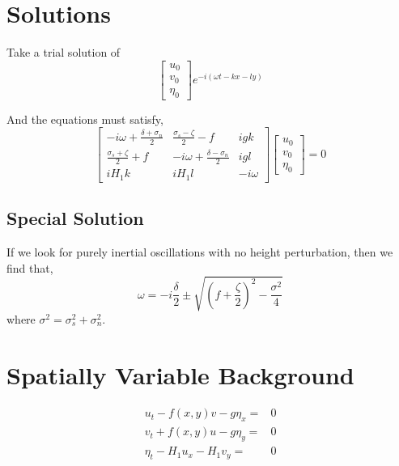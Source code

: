 \documentclass[11pt]{article}
\begin{document}
%
%
\section{Solutions}
%
%

Take a trial solution of
\begin{equation}
\left[\begin{array}{c}u_0 \\v_0 \\ \eta_0\end{array}\right]
e^{-i(\omega t - kx - ly)}
\end{equation}

And the equations must satisfy,
\begin{equation}
\left[\begin{array}{ccc}
-i\omega + \frac{\delta + \sigma_n}{2} & \frac{ \sigma_s - \zeta}{2} -f & igk \\
\frac{ \sigma_s + \zeta}{2}  + f  & -i\omega + \frac{ \delta - \sigma_n}{2} & igl \\
i H_1 k & i H_1 l & -i\omega
\end{array}\right]
\left[\begin{array}{c}u_0 \\v_0 \\ \eta_0\end{array}\right]
=0
\end{equation}

\subsection{Special Solution}

If we look for purely inertial oscillations with no height perturbation, then we find that,
\begin{equation}
\omega = -i \frac{\delta}{2} \pm \sqrt{ \left( f + \frac{\zeta}{2} \right)^2 - \frac{\sigma^2}{4} }
\end{equation}
where $\sigma^2 = \sigma_s^2 + \sigma_n^2$.

\section{Spatially Variable Background}

\begin{align}
u_t  - f(x,y) v - g\eta_x =& 0 \\
v_t + f(x,y) u - g\eta_y =& 0 \\
\eta_t - H_1 u_x - H_1 v_y =&0
\end{align}
\end{document}
